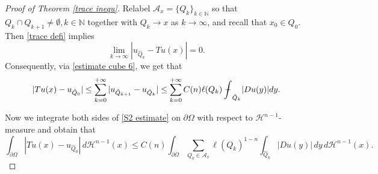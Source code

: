 \documentclass[reqno,11pt]{amsart}
\def\dist{{\mathop\mathrm{\,dist\,}}}
\def\bint{{\ifinner\rlap{\bf\kern.35em--}
\int\else\rlap{\bf\kern.45em--}\int\fi}\ignorespaces}
\numberwithin{equation}{section}
\theoremstyle{remark}
\def\bint{{\ifinner\rlap{\bf\kern.35em--}
\int\else\rlap{\bf\kern.45em--}\int\fi}\ignorespaces}
\begin{document}
\begin{proof}[Proof of Theorem \ref{trace inequ}]
Relabel $\mathscr{A}_x=\{Q_k\}_{k\in\mathbb N}$ so that $Q_k\cap Q_{k+1}\neq \emptyset, k\in \mathbb N$ together with $Q_k\to x$ as $k\to \infty$, and recall that $x_0\in Q_0$.
Then \eqref{trace defi} implies
\begin{equation}\label{convergence along curve 2}
   \lim_{k\to \infty}|u_{\hat{Q}_k}-Tu(x)| =0.
\end{equation}
Consequently, via \eqref{estimate cube 6}, we get that 
\begin{equation}\label{S2 estimate}
    |Tu(x)-u_{\hat{Q}_0}|\le \sum_{k=0}^{+\infty}|u_{\hat{Q
}_{k+1}}-u_{\hat{Q
}_k}|\le \sum_{k=0}^{+\infty} C(n)\ell(Q_k)\bint_{\hat{Q}_k}|Du(y)|dy.
\end{equation}


Now we integrate both sides of \eqref{S2 estimate} on $\partial \Omega$ with respect to $\mathcal H^{n-1}$-measure and obtain that
\begin{equation}\label{integral n-1}
\int_{\partial \Omega} |Tu(x)-u_{\hat{Q}_0}|\, d\mathcal H^{n-1}(x)\le C(n) \int_{\partial \Omega} \sum_{Q_k \in \mathscr A_x} \ell(Q_k)^{1-n}\int_{\hat{Q}_k}|Du(y)|\,dy\, d\mathcal H^{n-1}(x).
\end{equation}


\end{proof}
\end{document}
